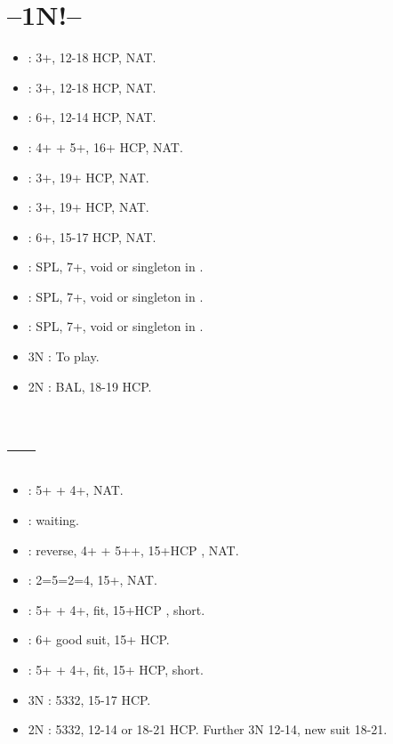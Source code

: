 \documentclass[12pt,twoside,a5paper]{report}%
\begin{document}
	\section*{--1N!--}
		\begin{itemize}
		\renewcommand{\labelitemi}{}
		\item {} : 3+\cl{}, 12-18 HCP, NAT.
		\item {} : 3+\di{}, 12-18 HCP, NAT.
		\item {} : 6+\he{}, 12-14 HCP, NAT.
		\item {} : 4+\sp{} + 5+\he{}, 16+ HCP, NAT.
		\item {} : 3+\cl{}, 19+ HCP, NAT.
		\item {} : 3+\di{}, 19+ HCP, NAT.
		\item {} : 6+\he{}, 15-17 HCP, NAT.
		\item {} : SPL, 7+\he{}, void or singleton in \sp{}. 
		\item {} : SPL, 7+\he{}, void or singleton in \cl{}.
		\item {} : SPL, 7+\he{}, void or singleton in \di{}.
		\item 3N : To play.
		\item 2N : BAL, 18-19 HCP.
		\end{itemize}

	\section*{----}
		\begin{itemize}
		\renewcommand{\labelitemi}{}
		\item {} : 5+\he{} + 4+\di{}, NAT.
		\item {} : waiting.
		\item {} : reverse, 4+\sp{} + 5+\he{}+, 15+HCP , NAT.
		\item {} : 2=5=2=4, 15+, NAT.
		\item {} : 5+\he{} + 4+\cl{}, fit, 15+HCP , short\di{}.
		\item {} : 6+\he{} good suit, 15+ HCP.
		\item {} : 5+\he{} + 4+\cl{}, fit, 15+ HCP, short\sp{}.
		\item 3N : 5332, 15-17 HCP.
		\item 2N : 5332, 12-14 or 18-21 HCP. Further 3N 12-14, new suit 18-21.
		\end{itemize}
\end{document}
